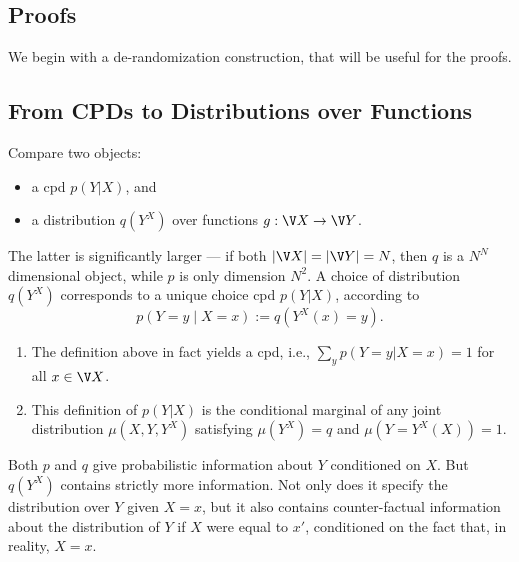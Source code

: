 \clearpage
\begin{subappendices}


\section{Proofs}
    \label{qim-appendix:proofs}
    

We begin with a de-randomization construction, that will be useful for the proofs. 

\subsection{From CPDs to Distributions over Functions}
    \label{sec:cpd-derandomize}
Compare two objects:
\begin{itemize}[nosep]
    \item a cpd $p(Y|X)$, and
    \item a distribution $q(Y^X)$ over functions $g : \V X \to \V Y$. 
\end{itemize}

The latter is significantly larger --- if both $|\V X| = | \V Y | = N$, then
$q$ is a $N^N$ dimensional object, while $p$ is only dimension $N^2$. 
A choice of distribution $q(Y^X)$ corresponds to a unique choice cpd $p(Y|X)$, according to 
\[
    p(Y{=}y\mid X{=}x) :=
        q(Y^X(x) = y)
        .
\]
\begin{claim}
\begin{enumerate}[nosep]
\item The definition above in fact yields a cpd, i.e., $\sum_y p(Y{=}y|X{=}x) = 1$
for all $x \in \V X$. 
\item 
This definition of $p(Y|X)$ is the conditional marginal of any
    joint distribution  $\mu(X,Y,Y^X)$ satisfying $\mu(Y^X) = q$ and
    $\mu(Y = Y^X(X)) = 1$. 
\end{enumerate}
\end{claim}
Both $p$ and $q$ give probabilistic information about $Y$ conditioned
on $X$. But $q(Y^X)$ contains strictly more information.
Not only does it specify the distribution over $Y$ given $X{=}x$,
but it also contains counter-factual information about the distribution of $Y$
    if $X$ were equal to $x'$, conditioned on the fact that, in reality, $X{=}x$.


\end{subappendices}

